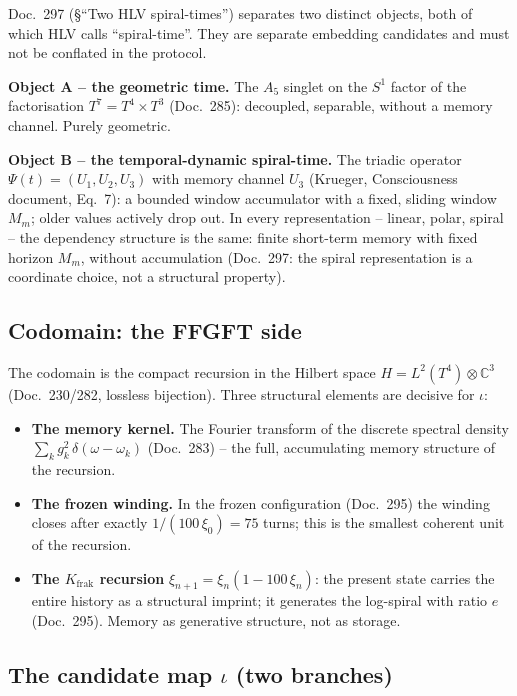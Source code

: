 Doc.~297 (§\enquote{Two HLV spiral-times}) separates two distinct objects,
both of which HLV calls \enquote{spiral-time}. They are separate embedding
candidates and must not be conflated in the protocol.

\textbf{Object A -- the geometric time.} The $A_5$ singlet on the $S^1$
factor of the factorisation $T^7 = T^4\times T^3$ (Doc.~285): decoupled,
separable, without a memory channel. Purely geometric.

\textbf{Object B -- the temporal-dynamic spiral-time.} The triadic operator
$\Psi(t) = (U_1, U_2, U_3)$ with memory channel $U_3$ (Krueger,
Consciousness document, Eq.~7): a bounded window accumulator with a fixed,
sliding window $M_m$; older values actively drop out. In every
representation -- linear, polar, spiral -- the dependency structure is the
same: finite short-term memory with fixed horizon $M_m$, without accumulation
(Doc.~297: the spiral representation is a coordinate choice, not a structural
property).

\subsection*{Codomain: the FFGFT side}

The codomain is the compact recursion in the Hilbert space
$H = L^2(T^4)\otimes\mathbb{C}^3$ (Doc.~230/282, lossless bijection). Three
structural elements are decisive for $\iota$:

\begin{itemize}
  \item \textbf{The memory kernel.} The Fourier transform of the discrete
    spectral density $\sum_k g_k^2\,\delta(\omega-\omega_k)$ (Doc.~283) --
    the full, accumulating memory structure of the recursion.
  \item \textbf{The frozen winding.} In the frozen configuration
    (Doc.~295) the winding closes after exactly $1/(100\,\xi_0) = 75$
    turns; this is the smallest coherent unit of the recursion.
  \item \textbf{The $K_{\text{frak}}$ recursion} $\xi_{n+1} =
    \xi_n(1 - 100\,\xi_n)$: the present state carries the entire history as a
    structural imprint; it generates the log-spiral with ratio $e$
    (Doc.~295). Memory as generative structure, not as storage.
\end{itemize}

\subsection*{The candidate map $\iota$ (two branches)}

